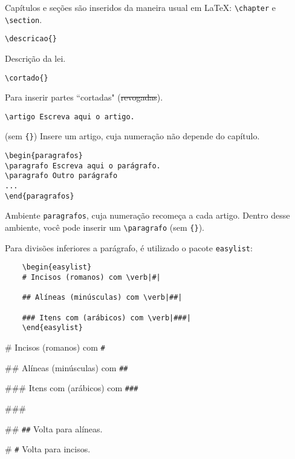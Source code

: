 \documentclass{ltxdoc}
\newcommand{\cortado}[1]{\sout{#1}}
\newcommand{\nota}[1]{\marginpar{\hfill \cmd{#1}}}
\begin{document}
Capítulos e seções são inseridos da maneira usual em \LaTeX: \verb|\chapter| e \verb|\section|.   


\begin{verbatim}\descricao{}
\end{verbatim}
\nota{\descricao\marg{Descrição}} 
Descrição da lei.


\begin{verbatim}\cortado{}
\end{verbatim}
\nota{\cortado\marg} 
Para inserir partes ``cortadas" (\cortado{revogadas}).


\begin{verbatim}
\artigo Escreva aqui o artigo.
\end{verbatim}
 
\cmd{\artigo} (sem \verb|{}|)\nota{\artigo} Insere um artigo, cuja numeração não depende do capítulo.



\begin{verbatim}
\begin{paragrafos}
\paragrafo Escreva aqui o parágrafo.
\paragrafo Outro parágrafo
...
\end{paragrafos}
\end{verbatim}

Ambiente \texttt{paragrafos},\nota{\paragrafo} cuja numeração recomeça a cada artigo. Dentro desse ambiente, você pode inserir um \verb|\paragrafo| (sem \verb|{}|). 

Para divisões inferiores a parágrafo, é utilizado o pacote \texttt{easylist}:

\begin{verbatim}
	\begin{easylist}
	# Incisos (romanos) com \verb|#|
	
	## Alíneas (minúsculas) com \verb|##|
	
	### Itens com (arábicos) com \verb|###|
	\end{easylist}
\end{verbatim}
	
	

\begin{easylist}
	# Incisos (romanos) com \verb|#|
	
	## Alíneas (minúsculas) com \verb|##|
	
	### Itens com (arábicos) com \verb|###|
	
	###
	
	## \verb|##| Volta para alíneas.
	
	# \verb|#| Volta para incisos.
	\end{easylist}
\end{document}
